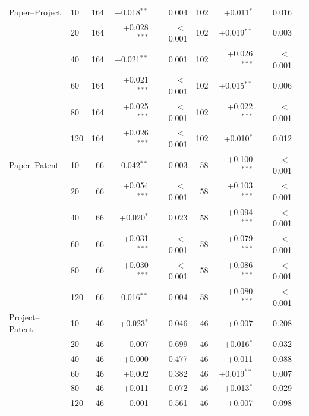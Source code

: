 \begin{longtable}{@{}llrrrrrrr@{}}
    Paper--Project & 10 & 164 & +0.018$^{**}$ & 0.004 & 102 & +0.011$^{*}$ & 0.016 \\
     & 20 & 164 & +0.028$^{***}$ & $<$\,0.001 & 102 & +0.019$^{**}$ & 0.003 \\
     & 40 & 164 & +0.021$^{**}$ & 0.001 & 102 & +0.026$^{***}$ & $<$\,0.001 \\
     & 60 & 164 & +0.021$^{***}$ & $<$\,0.001 & 102 & +0.015$^{**}$ & 0.006 \\
     & 80 & 164 & +0.025$^{***}$ & $<$\,0.001 & 102 & +0.022$^{***}$ & $<$\,0.001 \\
     & 120 & 164 & +0.026$^{***}$ & $<$\,0.001 & 102 & +0.010$^{*}$ & 0.012 \\
    \addlinespace[4pt]
    Paper--Patent & 10 & 66 & +0.042$^{**}$ & 0.003 & 58 & +0.100$^{***}$ & $<$\,0.001 \\
     & 20 & 66 & +0.054$^{***}$ & $<$\,0.001 & 58 & +0.103$^{***}$ & $<$\,0.001 \\
     & 40 & 66 & +0.020$^{*}$ & 0.023 & 58 & +0.094$^{***}$ & $<$\,0.001 \\
     & 60 & 66 & +0.031$^{***}$ & $<$\,0.001 & 58 & +0.079$^{***}$ & $<$\,0.001 \\
     & 80 & 66 & +0.030$^{***}$ & $<$\,0.001 & 58 & +0.086$^{***}$ & $<$\,0.001 \\
     & 120 & 66 & +0.016$^{**}$ & 0.004 & 58 & +0.080$^{***}$ & $<$\,0.001 \\
    \addlinespace[4pt]
    Project--Patent & 10 & 46 & +0.023$^{*}$ & 0.046 & 46 & +0.007 & 0.208 \\
     & 20 & 46 & $-$0.007 & 0.699 & 46 & +0.016$^{*}$ & 0.032 \\
     & 40 & 46 & +0.000 & 0.477 & 46 & +0.011 & 0.088 \\
     & 60 & 46 & +0.002 & 0.382 & 46 & +0.019$^{**}$ & 0.007 \\
     & 80 & 46 & +0.011 & 0.072 & 46 & +0.013$^{*}$ & 0.029 \\
     & 120 & 46 & $-$0.001 & 0.561 & 46 & +0.007 & 0.098 \\

\end{longtable}
